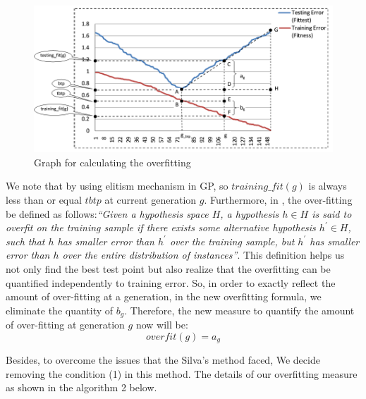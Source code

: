 \begin{enumerate}
\begin{enumerate}
\begin{figure}
\centering
\includegraphics[scale=0.4]{Figures/Fig3_4.png}
\caption{Graph for calculating the overfitting}
\label{fig:OV}       %
\end{figure}

We note that by using elitism mechanism in GP, so $training\_fit(g)$ is always less than or equal $tbtp$ at current generation $g$. Furthermore, in \cite{1996Mitchell}, the over-fitting be defined as follows:\textit{\textquotedblleft Given a hypothesis space $H$, a hypothesis $h \in H$ is said to overfit on the training sample if there exists some alternative hypothesis ${h}^{'} \in H$, such that $h$ has smaller error than ${h}^{'}$ over the training sample, but ${h}^{'}$ has smaller error than $h$ over the entire distribution of instances\textquotedblright}. This definition helps us not only find the best test point but also realize that the overfitting can be quantified independently to training error. So, in order to exactly reflect the amount of over-fitting at a generation, in the new overfitting formula, we eliminate the quantity of $b_{g}$. Therefore, the new measure to quantify the amount of over-fitting at generation $g$ now will be:
\begin{equation}
overfit (g) = a_{g} 	
\end{equation} \par
Besides, to overcome the issues that the Silva's method faced, We decide removing the condition (1) in this method. The details of our overfitting measure as shown in the algorithm 2 below.


\end{enumerate}
\end{enumerate}
